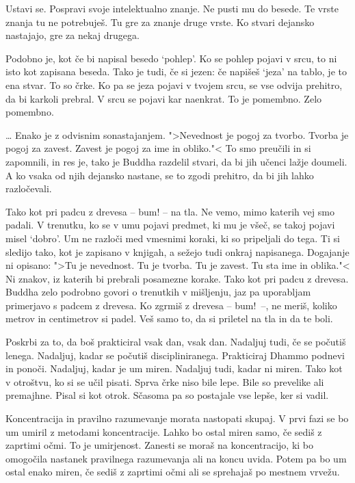 
Ustavi se. Pospravi svoje intelektualno znanje. Ne pusti mu do besede. Te vrste znanja tu ne potrebuješ. Tu gre za znanje druge vrste. Ko stvari dejansko nastajajo, gre za nekaj drugega.

Podobno je, kot če bi napisal besedo `pohlep'. Ko se pohlep pojavi v srcu, to ni isto kot zapisana beseda. Tako je tudi, če si jezen: če napišeš `jeza' na tablo, je to ena stvar. To so črke. Ko pa se jeza pojavi v tvojem srcu, se vse odvija prehitro, da bi karkoli prebral. V srcu se pojavi kar naenkrat. To je pomembno. Zelo pomembno.

\clearpage


\ldots{} Enako je z odvisnim sonastajanjem. ">Nevednost je pogoj za tvorbo. Tvorba je pogoj za zavest. Zavest je pogoj za ime in obliko."< To smo preučili in si zapomnili, in res je, tako je Buddha razdelil stvari, da bi jih učenci lažje doumeli. A ko vsaka od njih dejansko nastane, se to zgodi prehitro, da bi jih lahko razločevali.

Tako kot pri padcu z drevesa – bum! – na tla. Ne vemo, mimo katerih vej smo padali. V trenutku, ko se v umu pojavi predmet, ki mu je všeč, se takoj pojavi misel `dobro'. Um ne razloči med vmesnimi koraki, ki so pripeljali do tega. Ti si sledijo tako, kot je zapisano v knjigah, a sežejo tudi onkraj napisanega. Dogajanje ni opisano: ">Tu je nevednost. Tu je tvorba. Tu je zavest. Tu sta ime in oblika."< Ni znakov, iz katerih bi prebrali posamezne korake. Tako kot pri padcu z drevesa. Buddha zelo podrobno govori o trenutkih v mišljenju, jaz pa uporabljam primerjavo s padcem z drevesa. Ko zgrmiš z drevesa – bum! –, ne meriš, koliko metrov in centimetrov si padel. Veš samo to, da si priletel na tla in da te boli.

\clearpage


Poskrbi za to, da boš prakticiral vsak dan, vsak dan. Nadaljuj tudi, če se počutiš lenega. Nadaljuj, kadar se počutiš discipliniranega. Prakticiraj Dhammo podnevi in ponoči. Nadaljuj, kadar je um miren. Nadaljuj tudi, kadar ni miren. Tako kot v otroštvu, ko si se učil pisati. Sprva črke niso bile lepe. Bile so prevelike ali premajhne. Pisal si kot otrok. Sčasoma pa so postajale vse lepše, ker si vadil.


Koncentracija in pravilno razumevanje morata nastopati skupaj. V prvi fazi se bo um umiril z metodami koncentracije. Lahko bo ostal miren samo, če sediš z zaprtimi očmi. To je umirjenost. Zanesti se moraš na koncentracijo, ki bo omogočila nastanek pravilnega razumevanja ali na koncu uvida. Potem pa bo um ostal enako miren, če sediš z zaprtimi očmi ali se sprehajaš po mestnem vrvežu.

